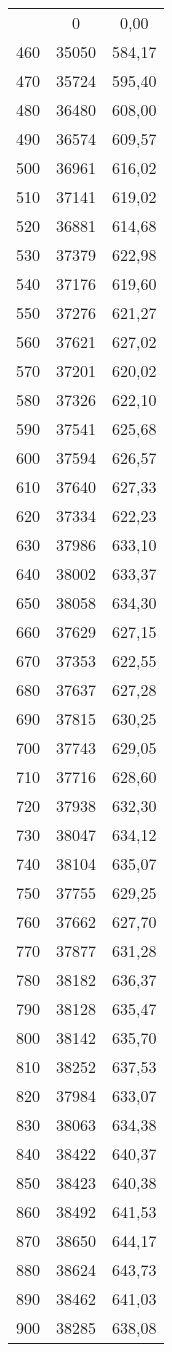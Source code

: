 \begin{longtable}{ccc}
\midrule
\endhead
\midrule
\endfoot
450 & 0 & 0,00 \\
460 & 35050 & 584,17 \\
470 & 35724 & 595,40 \\
480 & 36480 & 608,00 \\
490 & 36574 & 609,57 \\
500 & 36961 & 616,02 \\
510 & 37141 & 619,02 \\
520 & 36881 & 614,68 \\
530 & 37379 & 622,98 \\
540 & 37176 & 619,60 \\
550 & 37276 & 621,27 \\
560 & 37621 & 627,02 \\
570 & 37201 & 620,02 \\
580 & 37326 & 622,10 \\
590 & 37541 & 625,68 \\
600 & 37594 & 626,57 \\
610 & 37640 & 627,33 \\
620 & 37334 & 622,23 \\
630 & 37986 & 633,10 \\
640 & 38002 & 633,37 \\
650 & 38058 & 634,30 \\
660 & 37629 & 627,15 \\
670 & 37353 & 622,55 \\
680 & 37637 & 627,28 \\
690 & 37815 & 630,25 \\
700 & 37743 & 629,05 \\
710 & 37716 & 628,60 \\
720 & 37938 & 632,30 \\
730 & 38047 & 634,12 \\
740 & 38104 & 635,07 \\
750 & 37755 & 629,25 \\
760 & 37662 & 627,70 \\
770 & 37877 & 631,28 \\
780 & 38182 & 636,37 \\
790 & 38128 & 635,47 \\
800 & 38142 & 635,70 \\
810 & 38252 & 637,53 \\
820 & 37984 & 633,07 \\
830 & 38063 & 634,38 \\
840 & 38422 & 640,37 \\
850 & 38423 & 640,38 \\
860 & 38492 & 641,53 \\
870 & 38650 & 644,17 \\
880 & 38624 & 643,73 \\
890 & 38462 & 641,03 \\
900 & 38285 & 638,08 \\
\bottomrule
\end{longtable}


